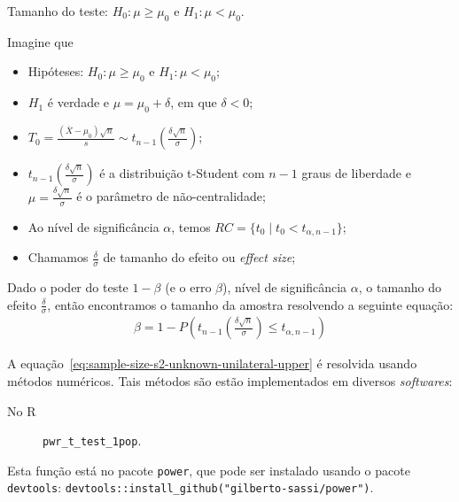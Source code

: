 \documentclass[8pt]{beamer}
\begin{document}
\begin{frame}{Tamanho do teste: $H_0:\mu \geq \mu_0$ e $H_1: \mu < \mu_0$.}

\normalsize

Imagine que
\begin{itemize}
	\item Hipóteses: $H_0: \mu \geq \mu_0$ e $H_1: \mu < \mu_0$;
	\item $H_1$ é verdade e $\mu = \mu_0 + \delta$, em que $\delta < 0$;
	\item $T_0 = \frac{(\bar{X} - \mu_0)\sqrt{n}}{s}  \sim t_{n-1}\left( \frac{\delta \sqrt{n}}{\sigma} \right)$;
	\item $t_{n-1}\left(\frac{\delta\sqrt{n}}{\sigma}\right)$ é a distribuição t-Student com $n-1$ graus de liberdade e $\mu=\frac{\delta \sqrt{n}}{\sigma}$ é o parâmetro de não-centralidade;
	\item Ao nível de significância $\alpha$, temos $RC = \{ t_0 \mid t_0 < t_{\alpha, n-1}   \}$;
	\item Chamamos $\frac{\delta}{\sigma}$ de tamanho do efeito ou \textit{effect size};
\end{itemize}
\vfill

Dado o poder do teste $1-\beta$ (e o erro $\beta$), nível de significância $\alpha$, o tamanho do efeito $\frac{\delta}{\sigma}$, então encontramos o tamanho da amostra resolvendo a seguinte equação:
\begin{align}\label{eq:sample-size-s2-unknown-unilateral-upper}
\beta = 1- P\left( t_{n-1}\left( \frac{\delta\sqrt{n}}{\sigma}\right) \leq t_{\alpha, n-1}  \right)
\end{align}

A equação~\eqref{eq:sample-size-s2-unknown-unilateral-upper} é resolvida usando métodos numéricos. Tais métodos são estão implementados em diversos \textit{softwares}:
\begin{description}
	\item[No R] \lstinline|pwr_t_test_1pop|.
\end{description}

Esta função está no pacote \lstinline|power|, que pode ser instalado usando o pacote \lstinline|devtools|: \lstinline|devtools::install_github("gilberto-sassi/power")|.

\normalsize

\end{frame}
\end{document}
